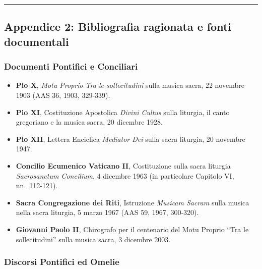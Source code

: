 \documentclass[12pt,a4paper]{article}
\begin{document}
	\begin{center}\rule{0.5\linewidth}{0.5pt}\end{center}
	
	\subsection{Appendice 2: Bibliografia ragionata e fonti documentali}\label{appendice-2-bibliografia-ragionata-e-fonti-documentali}
	
	\subsubsection{Documenti Pontifici e Conciliari}\label{documenti-pontifici-e-conciliari}
	
	\begin{itemize}[leftmargin=*]
		\item \textbf{Pio X}, \emph{Motu Proprio Tra le sollecitudini} sulla musica sacra, 22 novembre 1903 (AAS 36, 1903, 329-339).
		\item \textbf{Pio XI}, Costituzione Apostolica \emph{Divini Cultus} sulla liturgia, il canto gregoriano e la musica sacra, 20 dicembre 1928.
		\item \textbf{Pio XII}, Lettera Enciclica \emph{Mediator Dei} sulla sacra liturgia, 20 novembre 1947.
		\item \textbf{Concilio Ecumenico Vaticano II}, Costituzione sulla sacra liturgia \emph{Sacrosanctum Concilium}, 4 dicembre 1963 (in particolare Capitolo VI, nn.~112-121).
		\item \textbf{Sacra Congregazione dei Riti}, Istruzione \emph{Musicam Sacram} sulla musica nella sacra liturgia, 5 marzo 1967 (AAS 59, 1967, 300-320).
		\item \textbf{Giovanni Paolo II}, Chirografo per il centenario del Motu Proprio ``Tra le sollecitudini'' sulla musica sacra, 3 dicembre 2003.
	\end{itemize}
	
	\subsubsection{Discorsi Pontifici ed Omelie}\label{discorsi-pontifici-ed-omelie}
	
\end{document}

